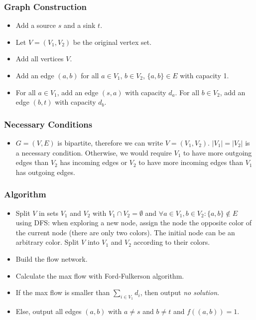 \documentclass[12pt]{article}
\begin{document}
\subsubsection*{Graph Construction}
\begin{itemize}
	\item Add a source $s$ and a sink $t$.
	\item Let $V=(V_1, V_2)$ be the original vertex set.
	\item Add all vertices $V$.
	\item Add an edge $(a, b)$ for all $a \in V_1$, $b \in V_2$, $\{a,b\} \in E$ with capacity 1.
	\item For all $a \in V_1$, add an edge $(s, a)$ with capacity $d_a$. For all $b \in V_2$, add an edge $(b, t)$ with capacity $d_b$.
\end{itemize}

\subsubsection*{Necessary Conditions}
\begin{itemize}
	\item $G=(V,E)$ is bipartite, therefore we can write $V=(V_1, V_2)$. $|V_1| = |V_2|$ is a necessary condition. Otherwise, we would require $V_1$ to have more outgoing edges than $V_2$ has incoming edges or $V_2$ to have more incoming edges than $V_1$ has outgoing edges.
\end{itemize}

\subsubsection*{Algorithm}
\begin{itemize}
	\item Split $V$ in sets $V_1$ and $V_2$ with $V_1 \cap V_2 = \emptyset$ and $\forall a \in V_1, b \in V_2: \{a, b\} \not\in E$ using DFS: when exploring a new node, assign the node the opposite color of the current node (there are only two colors). The initial node can be an arbitrary color. Split $V$ into $V_1$ and $V_2$ according to their colors.
	\item Build the flow network.
	\item Calculate the max flow with Ford-Fulkerson algorithm.
	\item If the max flow is smaller than $\sum_{i \in V_1} d_i$, then output \emph{no solution}.
	\item Else, output all edges $(a,b)$ with $a \not= s$ and $b \not= t$ and $f((a,b)) = 1$.
\end{itemize}
\end{document}
